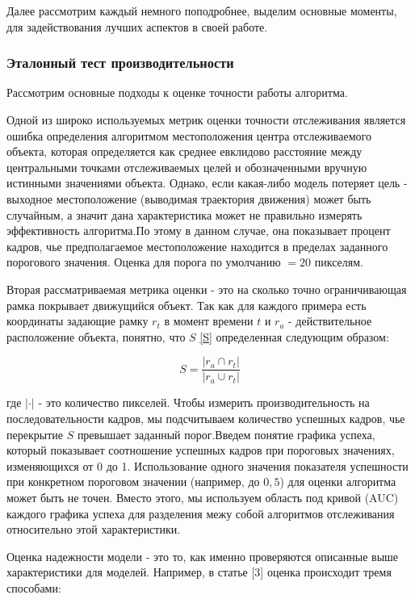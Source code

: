 \documentclass[14pt, a4paper]{article}
\begin{document}
Далее рассмотрим каждый немного поподробнее, выделим основные моменты, для задействования лучших аспектов в своей работе. 

\subsubsection{Эталонный тест производительности}

Рассмотрим основные подходы к оценке точности работы алгоритма. 

Одной из широко используемых метрик оценки точности отслеживания является ошибка определения алгоритмом местоположения центра отслеживаемого объекта, которая определяется как среднее евклидово расстояние между центральными точками отслеживаемых целей и обозначенными вручную истинными значениями объекта. Однако, если какая-либо модель потеряет цель - выходное местоположение (выводимая траектория движения) может быть случайным, а значит дана характеристика может не правильно измерять эффективность алгоритма.По этому в данном случае, она показывает процент кадров, чье предполагаемое местоположение находится в пределах заданного порогового значения. Оценка для порога по умолчанию $= 20$ пикселям.

Вторая рассматриваемая метрика оценки - это на сколько точно ограничивающая рамка покрывает движущийся объект.
Так как для каждого примера есть координаты задающие рамку $r_{t}$ в момент времени $t$ и $r_{a}$ - действительное расположение объекта, понятно, что $S$ \eqref{S} определенная следующим образом:

\begin{equation} \label{S}
    S = \dfrac{|r_{a} \cap r_{t}|}{|r_{a} \cup r_{t}|}
\end{equation}

где $| \cdot |$ - это количество пикселей. 
Чтобы измерить производительность на последовательности кадров, мы подсчитываем количество успешных кадров, чье перекрытие $S$ превышает заданный порог.Введем понятие  графика успеха, который показывает соотношение успешных кадров при пороговых значениях, изменяющихся от 0 до 1. Использование одного значения показателя успешности при конкретном пороговом значении (например, до $0,5$) для оценки алгоритма может быть не точен. Вместо этого, мы используем область под кривой (AUC) каждого графика успеха для разделения межу собой алгоритмов отслеживания относительно этой характеристики.

Оценка надежности модели - это то, как именно проверяются описанные выше характеристики для моделей. Например, в статье [3] оценка происходит тремя способами:
\end{document}
